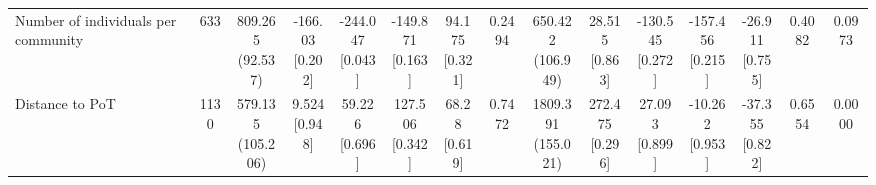 {\begin{tabular}[t]{lcccccccccccccc}
\hspace{1em}Number of individuals per community & 633 & \makecell[c]{809.265\\(92.537)} & \makecell[c]{-166.03\\{[0.202]}} & \makecell[c]{-244.047\\{[0.043]}} & \makecell[c]{-149.871\\{[0.163]}} & \makecell[c]{94.175\\{[0.321]}} & 0.2494 & \makecell[c]{650.422\\(106.949)} & \makecell[c]{28.515\\{[0.863]}} & \makecell[c]{-130.545\\{[0.272]}} & \makecell[c]{-157.456\\{[0.215]}} & \makecell[c]{-26.911\\{[0.755]}} & 0.4082 & 0.0973\\
\hspace{1em}Distance to PoT & 1130 & \makecell[c]{579.135\\(105.206)} & \makecell[c]{9.524\\{[0.948]}} & \makecell[c]{59.226\\{[0.696]}} & \makecell[c]{127.506\\{[0.342]}} & \makecell[c]{68.28\\{[0.619]}} & 0.7472 & \makecell[c]{1809.391\\(155.021)} & \makecell[c]{272.475\\{[0.296]}} & \makecell[c]{27.093\\{[0.899]}} & \makecell[c]{-10.262\\{[0.953]}} & \makecell[c]{-37.355\\{[0.822]}} & 0.6554 & 0.0000\\
\bottomrule
\end{tabular}}

